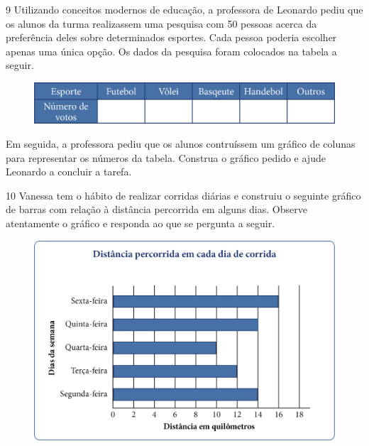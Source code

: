 \pagebreak
\num{9} Utilizando conceitos modernos de educação, a professora de Leonardo
pediu que os alunos da turma realizassem uma pesquisa com 50 pessoas acerca da
preferência deles sobre determinados esportes. Cada pessoa poderia escolher
apenas uma única opção. Os dados da pesquisa foram colocados na tabela
a seguir.

\begin{figure}[htpb!]
\centering
\includegraphics[width=\textwidth]{media/image48.png}
\end{figure}

Em seguida, a professora pediu que os alunos contruíssem um gráfico de
colunas para representar os números da tabela. Construa o gráfico pedido
e ajude Leonardo a concluir a tarefa.

\begin{mdframed}[linewidth=2pt,linecolor=salmao,roundcorner=2pt]
\vspace{14cm}
\end{mdframed}

\num{10} Vanessa tem o hábito de realizar corridas diárias e construiu o seguinte
gráfico de barras com relação à distância percorrida em alguns dias. 
Observe atentamente o gráfico e responda ao que se pergunta a seguir.

\begin{figure}[htpb!]
\centering
\includegraphics[width=\textwidth]{media/image49.png}
\end{figure}

